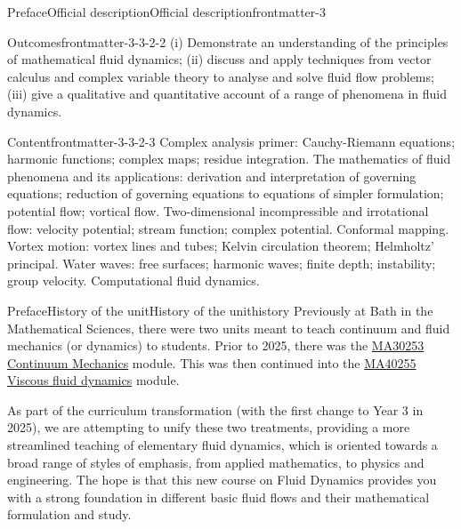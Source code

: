 \documentclass[oneside,10pt,]{book}
\numberwithin{equation}{section}
\begin{document}
\begin{preface}{Preface}{Official description}{}{Official description}{}{}{frontmatter-3}
\begin{descriptionlist}
\begin{dlinarrow}{Outcomes}{frontmatter-3-3-2-2}%
(i) Demonstrate an understanding of the principles of mathematical fluid dynamics; (ii) discuss and apply techniques from vector calculus and complex variable theory to analyse and solve fluid flow problems; (iii)  give a qualitative and quantitative account of a range of phenomena in fluid dynamics.%
\end{dlinarrow}%
\begin{dlinarrow}{Content}{frontmatter-3-3-2-3}%
Complex analysis primer: Cauchy-Riemann equations; harmonic functions; complex maps; residue integration. The mathematics of fluid phenomena and its applications: derivation and interpretation of governing equations; reduction of governing equations to equations of simpler formulation; potential flow; vortical flow. Two-dimensional incompressible and irrotational flow: velocity potential; stream function; complex potential. Conformal mapping. Vortex motion: vortex lines and tubes; Kelvin circulation theorem; Helmholtz' principal. Water waves: free surfaces; harmonic waves; finite depth; instability; group velocity. Computational fluid dynamics.%
\end{dlinarrow}%
\end{descriptionlist}
%
\end{preface}
%
%
\typeout{************************************************}
\typeout{************************************************}
%
\begin{preface}{Preface}{History of the unit}{}{History of the unit}{}{}{history}
Previously at Bath in the Mathematical Sciences, there were two units meant to teach continuum and fluid mechanics (or dynamics) to students. Prior to 2025, there was the \href{https://www.bath.ac.uk/catalogues/2024-2025/ma/MA30253.html}{MA30253 Continuum Mechanics} module. This was then continued into the \href{https://www.bath.ac.uk/catalogues/2024-2025/ma/MA40255.html}{MA40255 Viscous fluid dynamics} module.%
\par
As part of the curriculum transformation (with the first change to Year 3 in 2025), we are attempting to unify these two treatments, providing a more streamlined teaching of elementary fluid dynamics, which is oriented towards a broad range of styles of emphasis, from applied mathematics, to physics and engineering. The hope is that this new course on Fluid Dynamics provides you with a strong foundation in different basic fluid flows and their mathematical formulation and study.%
\end{preface}
\end{document}
